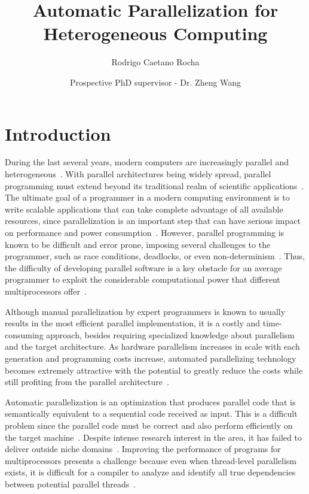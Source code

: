 \documentclass[a4paper,12pt]{article}
\title{\textbf{Automatic Parallelization for Heterogeneous Computing}}
\date{Prospective PhD supervisor - Dr. Zheng Wang}
\author[]{Rodrigo Caetano Rocha}
\begin{document}
\maketitle

\begin{abstract}

\end{abstract}

\section{Introduction}

During the last several years, modern computers are increasingly parallel and
heterogeneous~\cite{mohanty12,misailovic13}.  With parallel architectures being
widely spread, parallel programming must extend beyond its traditional realm of
scientific applications~\cite{li09}.  The ultimate goal of a programmer in a
modern computing environment is to write scalable applications that can take
complete advantage of all available resources, since parallelization is an
important step that can have serious impact on performance and
power consumption~\cite{cockx10}.  However, parallel programming is known to be difficult
and error prone, imposing several challenges to the programmer, such as race
conditions, deadlocks, or even
non-determinism~\cite{cockx10,mccool10,mccool12}.  Thus, the difficulty of
developing parallel software is a key obstacle for an average programmer to
exploit the considerable computational power that different multiprocessors
offer~\cite{misailovic13}.

Although manual parallelization by expert programmers is known to usually
results in the most efficient parallel implementation, it is a costly and
time-consuming approach, besides requiring specialized knowledge about
parallelism and the target architecture.  As hardware parallelism increases in
scale with each generation and programming costs increase, automated
parallelizing technology becomes extremely attractive with the potential to
greatly reduce the costs while still profiting from the parallel
architecture~\cite{tournavitis09,wang14a}.

Automatic parallelization is an optimization that produces parallel code that
is semantically equivalent to a sequential code received as input.  This is a
difficult problem since the parallel code must be correct and also perform
efficiently on the target machine~\cite{williams99}.  Despite intense research
interest in the area, it has failed to deliver outside niche
domains~\cite{tournavitis09,wang14a}.  Improving the performance of programs
for multiprocessors presents a challenge because even when thread-level
parallelism exists, it is difficult for a compiler to analyze and identify all
true dependencies between potential parallel threads~\cite{hammond98}.
\end{document}
